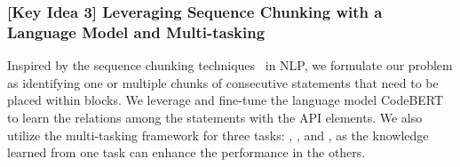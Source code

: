 \subsubsection{[Key Idea 3] Leveraging Sequence Chunking with a Language Model and Multi-tasking} 
Inspired by the sequence chunking
techniques~\cite{sequence-chunking-aaai17} in NLP, we formulate our
problem as identifying one or multiple chunks of consecutive
statements that need to be placed within  blocks. We
leverage and fine-tune the language model
CodeBERT~\cite{codebert-emnlp20} to learn the relations among the
statements with the API elements. We also utilize the multi-tasking
framework for three tasks: {\xblock}, {\xstate}, and {\xtype}, as the
knowledge learned from one task can enhance the performance in the others.




